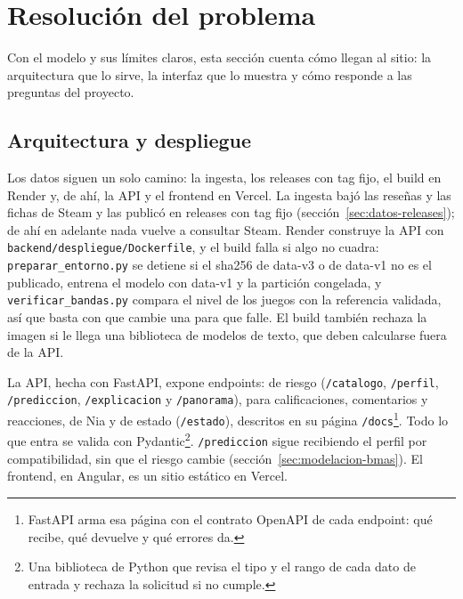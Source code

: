 \section{Resolución del problema}\label{sec:resolucion}

Con el modelo y sus límites claros, esta sección cuenta cómo llegan al sitio: la arquitectura que lo
sirve, la interfaz que lo muestra y cómo responde a las preguntas del proyecto.

\subsection{Arquitectura y despliegue}\label{sec:arquitectura}\label{sec:arquitectura-flujo}\label{sec:arquitectura-build}

Los datos siguen un solo camino: la ingesta, los releases con tag fijo, el build en Render y, de ahí,
la API y el frontend en Vercel. La ingesta bajó las reseñas y las
fichas de Steam y las publicó en releases con tag fijo (sección~\ref{sec:datos-releases}); de ahí
en adelante nada vuelve a consultar Steam. Render construye la API con
\texttt{backend/despliegue/Dockerfile}, y el build falla si algo no cuadra:
\texttt{preparar\_entorno.py} se detiene si el sha256 de data-v3 o de data-v1 no es el publicado,
entrena el modelo con data-v1 y la partición congelada, y \texttt{verificar\_bandas.py} compara el
nivel de los \cifraJuegosCatalogo{} juegos con la referencia validada, así que basta con que cambie
una para que falle. El build también rechaza la imagen si le llega una biblioteca de modelos de
texto, que deben calcularse fuera de la API.

La API, hecha con FastAPI, expone \cifraEndpoints{} endpoints: \cifraEndpointsRiesgo{} de riesgo
(\texttt{/catalogo}, \texttt{/perfil}, \texttt{/prediccion}, \texttt{/explicacion} y
\texttt{/panorama}), \cifraEndpointsComunidad{} para calificaciones, comentarios y reacciones,
\cifraEndpointsNia{} de Nia y \cifraEndpointsSistema{} de estado (\texttt{/estado}), descritos en su
página \texttt{/docs}\footnote{FastAPI arma esa página con el contrato OpenAPI de cada endpoint: qué
recibe, qué devuelve y qué errores da.}. Todo lo que entra se valida con Pydantic\footnote{Una biblioteca de Python que revisa el tipo y el rango de cada
dato de entrada y rechaza la solicitud si no cumple.}. \texttt{/prediccion} sigue recibiendo el
perfil por compatibilidad, sin que el riesgo cambie (sección~\ref{sec:modelacion-bmas}). El
frontend, en Angular, es un sitio estático en Vercel.

